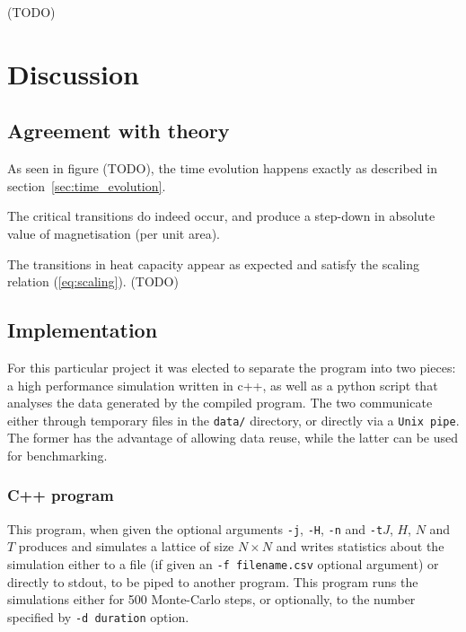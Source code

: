 \documentclass[11pt]{article}
\begin{document}
(TODO)

  

\section{Discussion}\label{sec:discussion}

\subsection{Agreement with theory}\label{sec:agreement}

As seen in figure (TODO), the time evolution happens exactly as described in section~\ref{sec:time_evolution}.

The critical transitions do indeed occur, and produce a step-down in absolute value of magnetisation (per unit area).

The transitions in heat capacity appear as expected and satisfy the scaling relation (\ref{eq:scaling}). (TODO)



\subsection{Implementation}\label{sec:implementation}

For this particular project it was elected to separate the program into two pieces: a high performance simulation written in c++, as well as a python script that analyses the data generated by the compiled program. The two communicate either through temporary files in the \texttt{data/} directory, or directly via a \texttt{Unix pipe}. The former has the advantage of allowing data reuse, while the latter can be used for benchmarking.


\subsubsection{C++ program}

This program, when given the optional arguments \texttt{-j}, \texttt{-H}, \texttt{-n} and \texttt{-t}\(J\), \(H\), \(N\) and \(T\) produces and simulates a lattice of size \(N \times N\) and writes statistics about the simulation either to a file (if given an \texttt{-f filename.csv} optional argument) or directly to stdout, to be piped to another program. This program runs the simulations either for 500 Monte-Carlo steps, or optionally, to the number specified by \texttt{-d duration} option. 
\end{document}
